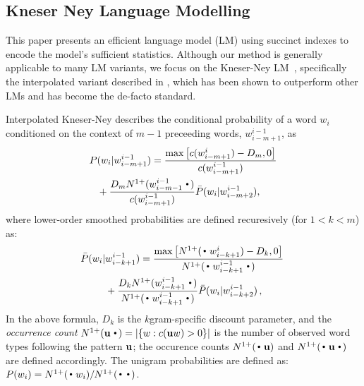 
\subsection{Kneser Ney Language Modelling}
\label{sec-lm}


This paper presents an efficient \ngram language model (LM) using succinct indexes to encode the model's sufficient statistics. %
Although our method is generally applicable to many LM variants, 
we focus on the Kneser-Ney LM~\cite{kneser1995improved}, 
specifically the interpolated variant described in , 
which has been shown to outperform other \ngram LMs and has become the de-facto standard.

Interpolated Kneser-Ney describes the conditional probability of a word $w_i$ conditioned on the context of $m-1$ preceeding words, $w_{i-m+1}^{i-1}$, as 
\begin{align}
P(w_i |& w_{i-m+1}^{i-1})=\frac{\max\left[c(w^{i}_{i-m+1}) - D_m,0\right]}{c(w^{i-1}_{i-m+1})} \nonumber \\
& \hspace{-6mm} +\frac{D_m \nlplus{w^{i-1}_{i-m-1}\Bigcdot} }{c(w^{i-1}_{i-m+1})}  
\bar{P}(w_i | w_{i-m+2}^{i-1}) ,  
\label{eq:high}
\end{align}
where lower-order smoothed probabilities are defined recuresively (for $1<k<m$) as: 
\begin{align}
\! \bar{P}(w_i |& w_{i-k+1}^{i-1})
 = \frac{\max\left[\nlplus{\Bigcdot w_{i-k+1}^{i}} - D_k,0\right]}{\nlplus{\Bigcdot w_{i-k+1}^{i-1} \Bigcdot}} \nonumber \\
&+ \frac{D_k \nlplus{w_{i-k+1}^{i-1}\Bigcdot}}{\nlplus{\Bigcdot w_{i-k+1}^{i-1} \Bigcdot}} \bar{P}(w_i | w_{i-k+2}^{i-1}) \, , \! \label{eq:mid}
\end{align}
In the above formula, $D_k$ is the $k$gram-specific discount parameter, and 
the \emph{occurrence count} 
\mbox{$\nlplus{\uu\Bigcdot} = |\{w: c(\uu w)>0\}|$} 
is the number of observed word types following the pattern ${\mathbf{u}}$; 
the occurence counts $\nlplus{\Bigcdot\uu}$ and $\nlplus{\Bigcdot\uu\Bigcdot}$ 
are defined accordingly.
The unigram probabilities are defined as:
%
$ P(w_i) = \nlplus{\Bigcdot w_i} / \nlplus{\Bigcdot\Bigcdot}$.

